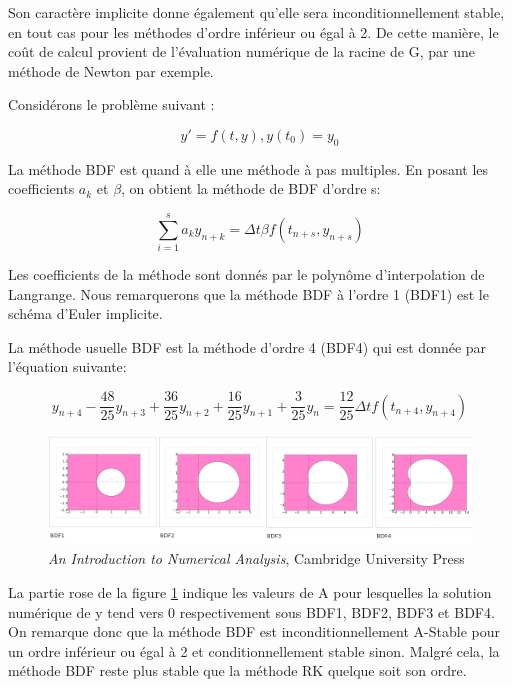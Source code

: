 Son caractère implicite donne également qu'elle sera inconditionnellement stable, en tout cas pour les méthodes d'ordre inférieur ou égal à 2. De cette manière, le coût de calcul provient de l'évaluation numérique de la racine de G, par une méthode de Newton par exemple.

Considérons le problème suivant :

\begin{equation}
    y' = f(t, y),    y(t_0) = y_0
\end{equation}

La méthode BDF est quand à elle une méthode à pas multiples. En posant les coefficients $a_k$ et $\beta$,  on obtient la méthode de BDF d'ordre s:

\begin{equation}
    \sum_{i=1}^{s} a_k y_{n+k} = \Delta t \beta f(t_{n+s}, y_{n+s})
\end{equation}

Les coefficients de la méthode sont donnés par le polynôme d'interpolation de Langrange. Nous remarquerons que la méthode BDF à l'ordre 1 (BDF1) est le schéma d'Euler implicite.

La méthode usuelle BDF est la méthode d'ordre 4 (BDF4) qui est donnée par l'équation suivante:

\begin{equation}
    y_{n+4} - \frac{48}{25}y_{n+3}+\frac{36}{25}y_{n+2}+\frac{16}{25}y_{n+1}+\frac{3}{25}y_n = \frac{12}{25}\Delta tf(t_{n+4}, y_{n+4})
\end{equation}

\begin{figure}[h!]
    \centering
    \includegraphics[width=\textwidth]{images/astab_bdf.png}
    \caption{\textit{An Introduction to Numerical Analysis}, Cambridge University Press}
\label{fig:astab_bdf}
\end{figure}

La partie rose de la figure \ref{fig:astab_bdf} indique les valeurs de A pour lesquelles la solution numérique de y tend vers 0 respectivement sous BDF1, BDF2, BDF3 et BDF4. On remarque donc que la méthode BDF est inconditionnellement A-Stable pour un ordre inférieur ou égal à 2 et conditionnellement stable sinon. Malgré cela, la méthode BDF reste plus stable que la méthode RK quelque soit son ordre.
